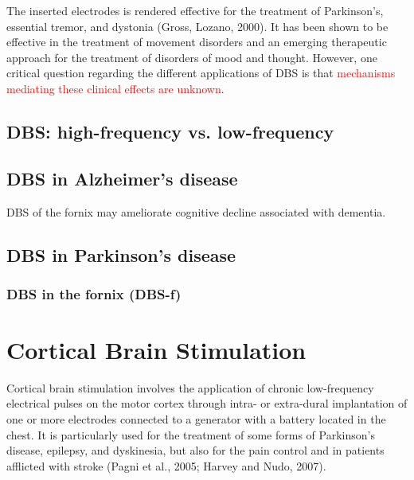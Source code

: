 The inserted electrodes is rendered effective for the treatment of Parkinson's,
essential tremor, and dystonia (Gross, Lozano, 2000).
It has been shown to be effective in the treatment of movement disorders and an
emerging therapeutic approach for the treatment of disorders of mood and
thought. However, one critical question regarding the different applications of
DBS is that \textcolor{red}{mechanisms mediating these clinical effects are
unknown}.


\section{DBS: high-frequency vs. low-frequency}
\label{sec:DBS-frequency-high-vs-low}



\section{DBS in Alzheimer's disease}

DBS of the fornix may ameliorate cognitive decline associated with dementia. 

\section{DBS in Parkinson's disease}



\subsection{DBS in the fornix (DBS-f)}
\label{sec:DBS-fornix}




\chapter{Cortical Brain Stimulation}
\label{sec:cortical-brain-stimulation}

Cortical brain stimulation involves the application of chronic low-frequency
electrical pulses on the motor cortex through intra- or extra-dural implantation
of one or more electrodes connected to a generator with a battery located in the
chest. It is particularly used for the treatment of some forms of Parkinson's
disease, epilepsy, and dyskinesia, but also for the pain control and in patients afflicted with stroke (Pagni et al., 2005; Harvey and Nudo, 2007).   


